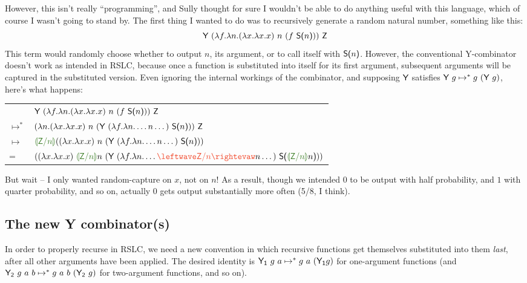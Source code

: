 \documentclass[10pt]{sigplanconf}
\begin{document}
However, this isn't really ``programming'', and Sully thought for sure I wouldn't be able to do anything useful with this language, which of course I wasn't going to stand by. The first thing I wanted to do was to recursively generate a random natural number, something like this:
\begin{equation}
\label{eq:randomnat}
\textsf{Y}~(\lambda f. \lambda n. (\lambda x. \lambda x. x)~n~(f~\textsf{S(}n\textsf{)}))~\textsf{Z}
\end{equation}
This term would randomly choose whether to output $n$, its argument, or to call itself with $\textsf{S(}n\textsf{)}$. However, the conventional Y-combinator doesn't work as intended in RSLC, because once a function is substituted into itself for its first argument, subsequent arguments will be captured in the substituted version.
Even ignoring the internal workings of the combinator, and supposing $\textsf{Y}$ satisfies $\textsf{Y}~g \mapsto^* g~(\textsf{Y}~g)$, here's what happens:

\begin{center}
\begin{tabular}{ll}
\hspace{-1em}
& $\textsf{Y}~(\lambda f. \lambda n. (\lambda x. \lambda x. x)~n~(f~\textsf{S(}n\textsf{)}))~\textsf{Z}$ \\
\hspace{-1em}
$\mapsto^*$ & $(\lambda n. (\lambda x. \lambda x. x)~n~(\textsf{Y}~(\lambda f.\lambda n. \dots n \dots)~\textsf{S(}n\textsf{)}))~\textsf{Z}$ \\
\hspace{-1em}
$\mapsto$ & $\subst{\Zero}{n}((\lambda x. \lambda x. x)~n~(\Y~(\lambda f.\lambda n. \dots n \dots)~\Suc{n}))$ \\
\hspace{-1em}
= & $((\lambda x. \lambda x. x)~\subst{\Zero}{n}n~(\Y~(\lambda f.\lambda n. \dots \capture{\Zero}{n}n \dots)~\Suc{\subst{\Zero}{n}n}))$ \\
\end{tabular}
\end{center}

But wait -- I only wanted random-capture on $x$, not on $n$! As a result, though we intended $0$ to be output with half probability, and $1$ with quarter probability, and so on, actually $0$ gets output substantially more often (5/8, I think).

\subsection{The new Y combinator(s)}
In order to properly recurse in RSLC, we need a new convention in which recursive functions get themselves substituted into them {\em last}, after all other arguments have been applied. The desired identity is $\mathsf{Y_1}~g~a \mapsto^* g~a~(\mathsf{Y_1} g)$ for one-argument functions (and $\mathsf{Y_2}~g~a~b \mapsto^* g~a~b~(\mathsf{Y_2}~g)$ for two-argument functions, and so on).
\end{document}
